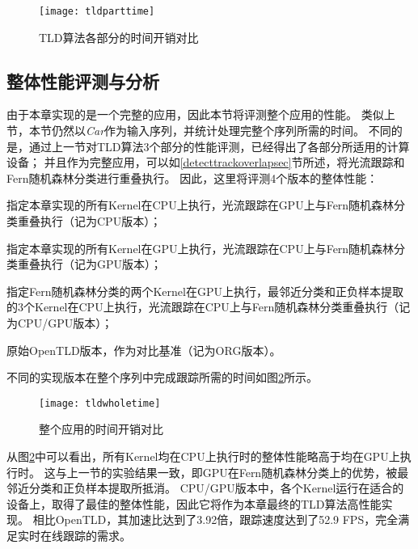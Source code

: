 \begin{figure}[htb]
  \centering
  \texttt{[image: tldparttime]}
  \caption{TLD算法各部分的时间开销对比}
  \label{tldparttime}
\end{figure}

\subsection{整体性能评测与分析}
由于本章实现的是一个完整的应用，因此本节将评测整个应用的性能。
类似上节，本节仍然以\textit{Car}作为输入序列，并统计处理完整个序列所需的时间。
不同的是，通过上一节对TLD算法3个部分的性能评测，已经得出了各部分所适用的计算设备；
并且作为完整应用，可以如\ref{detecttrackoverlapsec}节所述，将光流跟踪和Fern随机森林分类进行重叠执行。
因此，这里将评测4个版本的整体性能：
\begin{compactitem}
\item 指定本章实现的所有Kernel在CPU上执行，光流跟踪在GPU上与Fern随机森林分类重叠执行（记为CPU版本）；
\item 指定本章实现的所有Kernel在GPU上执行，光流跟踪在CPU上与Fern随机森林分类重叠执行（记为GPU版本）；
\item 指定Fern随机森林分类的两个Kernel在GPU上执行，最邻近分类和正负样本提取的3个Kernel在CPU上执行，光流跟踪在CPU上与Fern随机森林分类重叠执行（记为CPU/GPU版本）；
\item 原始OpenTLD版本，作为对比基准（记为ORG版本）。
\end{compactitem}
不同的实现版本在整个序列中完成跟踪所需的时间如图\ref{tldwholetime}所示。

\begin{figure}[htb]
  \centering
  \texttt{[image: tldwholetime]}
  \caption{整个应用的时间开销对比}
  \label{tldwholetime}
\end{figure}

从图\ref{tldwholetime}中可以看出，所有Kernel均在CPU上执行时的整体性能略高于均在GPU上执行时。
这与上一节的实验结果一致，即GPU在Fern随机森林分类上的优势，被最邻近分类和正负样本提取所抵消。
CPU/GPU版本中，各个Kernel运行在适合的设备上，取得了最佳的整体性能，因此它将作为本章最终的TLD算法高性能实现。
相比OpenTLD，其加速比达到了3.92倍，跟踪速度达到了52.9 FPS，完全满足实时在线跟踪的需求。

